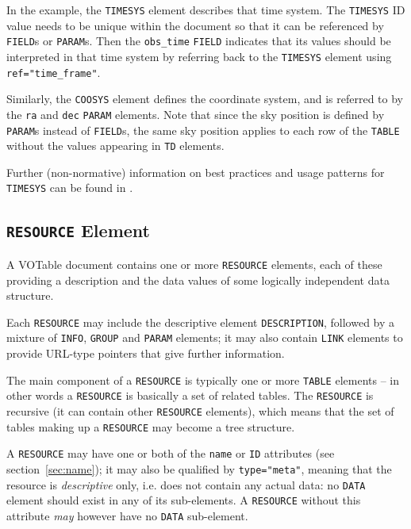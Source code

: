 \documentclass[11pt,a4paper]{ivoa}
\def\Aref#1{section~\ref{#1}}
\let\fg=\color
\def\attr#1{{\tt{\fg{DarkRed}#1}}}
\def\elem#1{{\tt{\fg{DarkRed}#1}}}
\def\attrval#1#2{{\tt{\fg{DarkRed}#1}="{\fg{DarkPurple}#2}"}}
\begin{document}
In the example, the \elem{TIMESYS} element describes that time system.  The
\elem{TIMESYS} ID value needs to be unique within the document so that it can be
referenced by \elem{FIELD}s or  \elem{PARAM}s.  Then the \attr{obs\_time}
\elem{FIELD} indicates that its values should be interpreted in that time system by
referring back to the \elem{TIMESYS} element using \attrval{ref}{time\_frame}.

Similarly, the \elem{COOSYS} element defines the coordinate system, and is
referred to by the  \attr{ra}  and  \attr{dec} \elem{PARAM} elements.  Note that
since the sky position is defined by \elem{PARAM}s instead of \elem{FIELD}s,
the same sky position applies to each row of the \elem{TABLE} without the values
appearing in \elem{TD} elements.

Further (non-normative) information on best practices and usage patterns
for \elem{TIMESYS} can be found in \citet{timesys}.

\begingroup\small

\endgroup


\subsection{\elem{RESOURCE} Element}
\label{sec:resource}
\label{elem:RESOURCE}

A VOTable document contains one or more {\elem{RESOURCE}}
elements, each of these providing a description and the
data values of some logically independent data structure.


Each \elem{RESOURCE} may include the descriptive element {\elem{DESCRIPTION}},
followed by a mixture of
{\elem{INFO}}, {\elem{GROUP}} and {\elem{PARAM}} elements;
it may also contain {\elem{LINK}}
elements to provide URL-type pointers that give further information.

The main component of a \elem{RESOURCE} is typically one or more \elem{TABLE}
elements -- in other words a \elem{RESOURCE} is basically a set
of related tables. The \elem{RESOURCE} is recursive (it can contain other
\elem{RESOURCE} elements), which means that the set of tables making up
a \elem{RESOURCE} may become a tree structure.

A \elem{RESOURCE} may have one or both of the \attr{name} or \attr{ID}
attributes (see \Aref{sec:name}); it may also be qualified by
\attrval{type}{meta}, meaning that the resource is {\em descriptive}
only, i.e. does not contain any actual data: no \elem{DATA} element
should exist in any of its sub-elements. A \elem{RESOURCE} without
this attribute {\em may} however have no \elem{DATA} sub-element.
\end{document}

